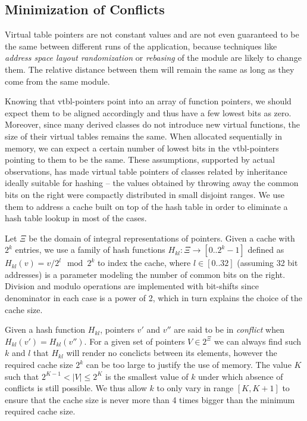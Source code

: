 
\subsection{Minimization of Conflicts}
\label{sec:moc}

Virtual table pointers are not constant values and are not even guaranteed to be 
the same between different runs of the application, because techniques like 
\emph{address space layout randomization} or \emph{rebasing} of the module are 
likely to change them. The relative distance between them will remain the same 
as long as they come from the same module.

Knowing that vtbl-pointers point into an array of function pointers, we should 
expect them to be aligned accordingly and thus have a few lowest bits as zero. 
Moreover, since many derived classes do not introduce new virtual functions, 
the size of their virtual tables remains the same. When allocated sequentially 
in memory, we can expect a certain number of lowest bits in the vtbl-pointers 
pointing to them to be the same.
These assumptions, supported by actual observations, has made virtual table 
pointers of classes related by inheritance ideally suitable for hashing -- the 
values obtained by throwing away the common bits on the right were compactly 
distributed in small disjoint ranges. We use them to address a cache 
built on top of the hash table in order to eliminate a hash table lookup in most 
of the cases.

Let $\Xi$ be the domain of integral representations of pointers. Given a cache 
with $2^k$ entries, we use a family of hash functions $H_{kl} : \Xi \rightarrow [0..2^k-1]$ 
defined as $H_{kl}(v)=v/2^l \mod 2^k$ to index the cache, where $l \in [0..32]$ 
(assuming 32 bit addresses) is a parameter modeling the number of common bits on 
the right. Division and modulo operations are implemented with bit-shifts since 
denominator in each case is a power of 2, which in turn explains the choice of 
the cache size.

Given a hash function $H_{kl}$, pointers $v'$ and $v''$ are said to be in 
\emph{conflict} when $H_{kl}(v')=H_{kl}(v'')$. For a given set of pointers 
$V \in 2^{\Xi}$ we can always find such $k$ and $l$ that $H_{kl}$ will render no  
conclicts between its elements, however the required cache size $2^k$ can be too 
large to justify the use of memory. The value $K$ such that $2^{K-1} < |V| \leq 2^K$ 
is the smallest value of $k$ under which absence of conflicts is still possible. 
We thus allow $k$ to only vary in range $[K,K+1]$ to ensure that the cache size 
is never more than 4 times bigger than the minimum required cache size.

